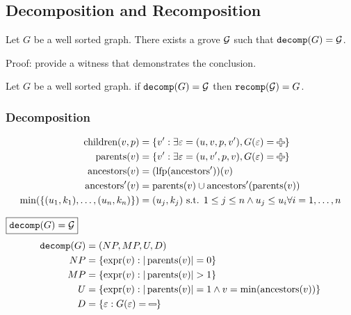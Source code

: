 \subsection{Decomposition and Recomposition}

\begin{theorem}
  Let $G$ be a well sorted graph.
  There exists a grove $\mathcal{G}$ such that $\operatorname{\texttt{decomp}}\mathopen{}\left(G\right)\mathclose{} = \mathcal{G}$.
\end{theorem}

Proof: provide a witness that demonstrates the conclusion.



\begin{theorem}
  Let $G$ be a well sorted graph.
  if $\operatorname{\texttt{decomp}}\mathopen{}\left(G\right)\mathclose{} = \mathcal{G}$ then $\operatorname{\texttt{recomp}}\mathopen{}\left(\mathcal{G}\right)\mathclose{} = G$.
\end{theorem}


\subsubsection{Decomposition}

\begin{align*}
  \children(v, p) &= \SetOf{v' \SuchThat{\exists \e = (u, v, p, v'), G(\e) = \Plus}} \\
  \parents(v) &= \SetOf{v' \SuchThat{\exists \e = (u, v', p, v), G(\e) = \Plus}} \\
  \ancestors(v) &= \mathopen{}\left( \lfp(\ancestors') \right)\mathclose{}(v) \\
  \ancestors'(v) &= \parents(v) \cup \ancestors'(\parents(v)) \\
  \min\mathopen{}\left(\SetOf{(u_1, k_1), \ldots, (u_n, k_n)}\right)\mathclose{} &= (u_j, k_j) \text{ s.t. } 1 \leq j \leq n \land u_j \le u_i \forall i = 1, \ldots, n
\end{align*}

\noindent $\boxed{\operatorname{\texttt{decomp}}\mathopen{}\left(G\right)\mathclose{} = \mathcal{G}}$
%
\begin{align*}
  \decomp{G} &= (NP, MP, U, D) \\
  NP &= \SetOf{\expr(v) \SuchThat{|\parents(v)| = 0}} \\
  MP &= \SetOf{\expr(v) \SuchThat{|\parents(v)| > 1}} \\
  U &= \SetOf{\expr(v) \SuchThat{|\parents(v)| = 1 \land v = \min(\ancestors(v))}} \\
  D &= \SetOf{\e \SuchThat{G(\e) = \Minus}}
\end{align*}

